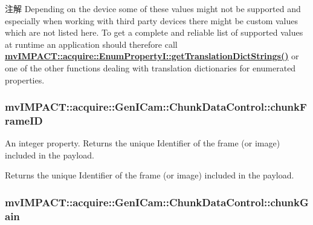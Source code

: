 \begin{DoxyNote}{注解}
Depending on the device some of these values might not be supported and especially when working with third party devices there might be custom values which are not listed here. To get a complete and reliable list of supported values at runtime an application should therefore call {\bfseries \hyperlink{classmv_i_m_p_a_c_t_1_1acquire_1_1_enum_property_i_a0ba6ccbf5ee69784d5d0b537924d26b6}{mv\+I\+M\+P\+A\+C\+T\+::acquire\+::\+Enum\+Property\+I\+::get\+Translation\+Dict\+Strings()}} or one of the other functions dealing with translation dictionaries for enumerated properties. 
\end{DoxyNote}
\hypertarget{classmv_i_m_p_a_c_t_1_1acquire_1_1_gen_i_cam_1_1_chunk_data_control_a5d3849e86e7ae821d2a3ca73d6b472fc}{
\subsubsection[{chunk\+Frame\+I\+D}]{ mv\+I\+M\+P\+A\+C\+T\+::acquire\+::\+Gen\+I\+Cam\+::\+Chunk\+Data\+Control\+::chunk\+Frame\+I\+D}}\label{classmv_i_m_p_a_c_t_1_1acquire_1_1_gen_i_cam_1_1_chunk_data_control_a5d3849e86e7ae821d2a3ca73d6b472fc}


An integer property. Returns the unique Identifier of the frame (or image) included in the payload. 

Returns the unique Identifier of the frame (or image) included in the payload. \hypertarget{classmv_i_m_p_a_c_t_1_1acquire_1_1_gen_i_cam_1_1_chunk_data_control_ab8a83e2478ddaae9fc8b59d86cbe75a5}{
\subsubsection[{chunk\+Gain}]{ mv\+I\+M\+P\+A\+C\+T\+::acquire\+::\+Gen\+I\+Cam\+::\+Chunk\+Data\+Control\+::chunk\+Gain}}\label{classmv_i_m_p_a_c_t_1_1acquire_1_1_gen_i_cam_1_1_chunk_data_control_ab8a83e2478ddaae9fc8b59d86cbe75a5}


